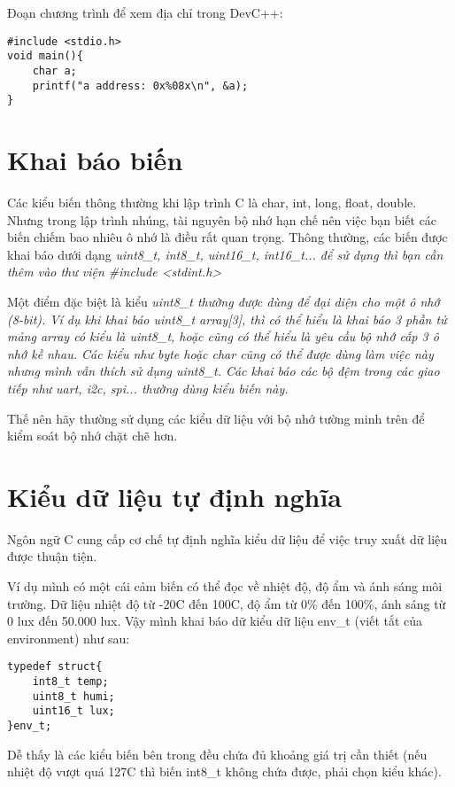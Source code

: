Đoạn chương trình để xem địa chỉ trong DevC++:\*
\begin{lstlisting}
#include <stdio.h>
void main(){
    char a;
    printf("a address: 0x%08x\n", &a);
}
\end{lstlisting}


\section{Khai báo biến}

Các kiểu biến thông thường khi lập trình C là char, int, long, float, double. Nhưng trong lập trình nhúng, tài nguyên bộ nhớ hạn chế nên việc bạn biết các biến chiếm bao nhiêu ô nhớ là điều rất quan trọng. Thông thường, các biến được khai báo dưới dạng \it{uint8\_t}, \it{int8\_t}, \it{uint16\_t}, \it{int16\_t}... để sử dụng thì bạn cần thêm vào thư viện \it{\#include <stdint.h>}

Một điểm đặc biệt là kiểu \it{uint8\_t} thường được dùng để đại diện cho một ô nhớ (8-bit). Ví dụ khi khai báo \it{uint8\_t array[3]}, thì có thể hiểu là khai báo 3 phần tử mảng array có kiểu là \it{uint8\_t}, hoặc cũng có thể hiểu là yêu cầu bộ nhớ cấp 3 ô nhớ kề nhau. Các kiểu như byte hoặc char cũng có thể được dùng làm việc này nhưng mình vẫn thích sử dụng \it{uint8\_t}. Các khai báo các bộ đệm trong các giao tiếp như uart, i2c, spi... thường dùng kiểu biến này.

Thế nên hãy thường sử dụng các kiểu dữ liệu với bộ nhớ tường minh trên để kiểm soát bộ nhớ chặt chẽ hơn.

\section{Kiểu dữ liệu tự định nghĩa}

Ngôn ngữ C cung cấp cơ chế tự định nghĩa kiểu dữ liệu để việc truy xuất dữ liệu được thuận tiện.

Ví dụ mình có một cái cảm biến có thể đọc về nhiệt độ, độ ẩm và ánh sáng môi trường. Dữ liệu nhiệt độ từ  -20\textdegree{}C đến 100\textdegree{}C, độ ẩm từ 0\% đến 100\%, ánh sáng từ 0 lux đến 50.000 lux. Vậy mình khai báo dữ kiểu dữ liệu env\_t (viết tắt của environment) như sau:

\begin{lstlisting}
typedef struct{
    int8_t temp;
    uint8_t humi;
    uint16_t lux;
}env_t;
\end{lstlisting}

Dễ thấy là các kiểu biến bên trong đều chứa đủ khoảng giá trị cần thiết (nếu nhiệt độ vượt quá 127\textdegree{}C thì biến int8\_t không chứa được, phải chọn kiểu khác).


